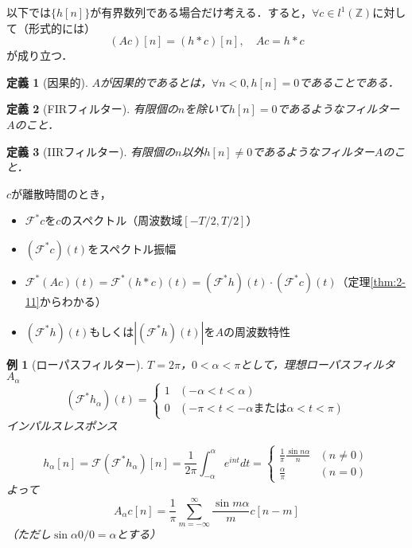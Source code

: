 \documentclass[dvipdfmx,a4j,10pt]{jsarticle}
\theoremstyle{mystyle1}
\theoremstyle{mystyle3}
\newtheorem{example}{例}[section]
\theoremstyle{mystyle4}
\theoremstyle{mystyle6}
\theoremstyle{mystyle2}
\newtheorem{dfn*}{定義}
\theoremstyle{mystyle5}
\newenvironment{ex}[1][]
{\begin{tcolorbox}[
    enhanced,
    boxrule=0pt,
    arc=0mm,
    frame hidden,
    borderline west={0.25pt}{-4pt}{black},
    borderline west={0.25pt}{-2.25pt}{black},
    breakable = true
    ]
    \begin{example}[#1]
}
{\end{example}\end{tcolorbox}}
\begin{document}
以下では$\{h[n]\}$が有界数列である場合だけ考える．すると，$\forall c\in l^1(\mathbb{Z})$に対して（形式的には）
\[
	(Ac)[n]=(h*c)[n],\quad Ac=h*c
\]
が成り立つ．

\begin{dfn*}[因果的]
	$A$が因果的であるとは，$\forall n<0, h[n]=0$であることである．
\end{dfn*}

\begin{dfn*}[FIRフィルター]
	有限個の$n$を除いて$h[n]=0$であるようなフィルター$A$のこと．
\end{dfn*}

\begin{dfn*}[IIRフィルター]
	有限個の$n$以外$h[n]\neq 0$であるようなフィルター$A$のこと．
\end{dfn*}

$c$が離散時間のとき，
\begin{itemize}
	\item $\mathcal{F}^*c$を$c$のスペクトル（周波数域$[-T/2,T/2]$）
	\item $(\mathcal{F}^*c)(t)$をスペクトル振幅
	\item $\mathcal{F}^*(Ac)(t)=\mathcal{F}^*(h*c)(t)=(\mathcal{F}^*h)(t)\cdot(\mathcal{F}^*c)(t)$（定理\ref{thm:2-11}からわかる）
	\item $(\mathcal{F}^*h)(t)$もしくは$|(\mathcal{F}^*h)(t)|$を$A$の周波数特性
\end{itemize}

\begin{ex}[ローパスフィルター]
	$T=2\pi$，$0<\alpha<\pi$として，理想ローパスフィルタ$A_\alpha$
	\[
		(\mathcal{F}^*h_\alpha)(t)=\begin{cases}
			1 & (-\alpha<t<\alpha)                   \\
			0 & (-\pi<t<-\alpha または \alpha<t<\pi)
		\end{cases}
	\]
	インパルスレスポンス

	\[
		h_\alpha[n]=\mathcal{F}(\mathcal{F}^* h_\alpha)[n]=\frac{1}{2\pi}\int_{-\alpha}^\alpha e^{int}dt=\begin{cases}
			\frac{1}{\pi}\frac{\sin n\alpha}{n} & (n\neq 0) \\
			\frac{\alpha}{\pi}                  & (n=0)
		\end{cases}
	\]
	よって
	\[
		A_\alpha c[n]=\frac{1}{\pi}\sum_{m=-\infty}^\infty \frac{\sin m\alpha}{m}c[n-m]
	\]
	（ただし$\sin\alpha0/0=\alpha$とする）
\end{ex}

\newpage
\end{document}
